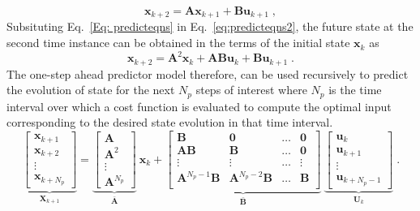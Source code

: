 % 
\begin{equation}
\label{eq:predicteqns2}
    \mathbf{x}_{k+2} = \mathbf{Ax}_{k+1} + \mathbf{B}\mathbf{u}_{k+1} \;,
\end{equation}
% 
Subsituting Eq.~\ref{Eq: predicteqns} in Eq.~\ref{eq:predicteqns2}, the future state at the second time instance can be obtained in the terms of the initial state $\mathbf{x}_k$ as
% 
\begin{equation}
    \mathbf{x}_{k+2} = \mathbf{A}^2\mathbf{x}_{k} + \mathbf{AB}\mathbf{u}_{k} + \mathbf{B}\mathbf{u}_{k+1} \;.
\end{equation}
% 
The one-step ahead predictor model therefore, can be used recursively to predict the evolution of state for the next $N_p$ steps of interest where $N_p$ is the time interval over which a cost function is evaluated to compute the optimal input corresponding to the desired state evolution in that time interval.
% 
\begin{equation}
\label{eq: Nstep}
    \underbrace{\begin{bmatrix}
    \mathbf{x}_{k+1} \\
    \mathbf{x}_{k+2}\\
    \vdots\\
    \mathbf{x}_{k+N_p} 
    \end{bmatrix}}_{\mathbf{X}_{k+1}} = \underbrace{\begin{bmatrix}
    \mathbf{A}\\
    \mathbf{A}^2\\
    \vdots\\
    \mathbf{A}^{N_p}
    \end{bmatrix}}_{\mathbf{\bar{A}}}~\mathbf{x}_k + \underbrace{\begin{bmatrix}
    \mathbf{B} & \mathbf{0} & \dots & \mathbf{0}\\
    \mathbf{AB} & \mathbf{B} & \dots & \mathbf{0}\\
    \vdots & \vdots & \dots & \vdots\\ 
    \mathbf{A}^{N_p-1}\mathbf{B} & \mathbf{A}^{N_p-2}\mathbf{B} & \dots & \mathbf{B}\\
    \end{bmatrix}}_{\mathbf{\bar{B}}} ~ \underbrace{\begin{bmatrix}
    \mathbf{u}_k \\
    \mathbf{u}_{k+1}\\
    \vdots\\
    \mathbf{u}_{k+N_p-1}
    \end{bmatrix}}_{\mathbf{U}_k}\;.
\end{equation}
